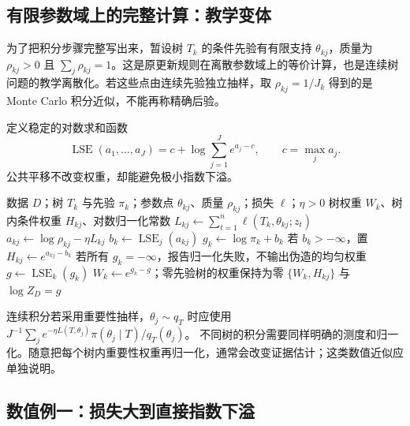 \subsection{有限参数域上的完整计算：教学变体}

为了把积分步骤完整写出来，暂设树 $T_k$ 的条件先验有有限支持
$\theta_{kj}$，质量为 $\rho_{kj}>0$ 且 $\sum_j\rho_{kj}=1$。这是原更新规则在离散参数域上的等价计算，也是连续树问题的教学离散化。若这些点由连续先验独立抽样，取 $\rho_{kj}=1/J_k$ 得到的是 Monte Carlo 积分近似，不能再称精确后验。

定义稳定的对数求和函数
\[
 \operatorname{LSE}(a_1,\ldots,a_J)
 =c+\log\sum_{j=1}^J e^{a_j-c},\qquad c=\max_j a_j.
\]
公共平移不改变权重，却能避免极小指数下溢。

\begin{algorithm}[htbp]
\caption{S14：有限候选树与有限条件先验的指数更新（教学离散化）}
\label{alg:textbook-S14}
\begin{algorithmic}[1]
\Require 数据 $D$；树 $T_k$ 与先验 $\pi_k$；参数点 $\theta_{kj}$、质量 $\rho_{kj}$；损失 $\ell$；$\eta>0$
\Ensure 树权重 $W_k$、树内条件权重 $H_{kj}$、对数归一化常数
    \State $L_{kj}\gets\sum_{t=1}^n\ell(T_k,\theta_{kj};z_t)$
    \State $a_{kj}\gets\log\rho_{kj}-\eta L_{kj}$
  \EndFor
  \State $b_k\gets\operatorname{LSE}_j(a_{kj})$
  \State $g_k\gets\log\pi_k+b_k$
  \State 若 $b_k>-\infty$，置 $H_{kj}\gets e^{a_{kj}-b_k}$
\EndFor
\State 若所有 $g_k=-\infty$，报告归一化失败，不输出伪造的均匀权重
\State $g\gets\operatorname{LSE}_k(g_k)$
\State $W_k\gets e^{g_k-g}$；零先验树的权重保持为零
\State \Return $\{W_k,H_{kj}\}$ 与 $\log Z_D=g$
\end{algorithmic}
\end{algorithm}

连续积分若采用重要性抽样，$\theta_j\sim q_T$ 时应使用
$J^{-1}\sum_j e^{-\eta L(T,\theta_j)}\pi(\theta_j\mid T)/q_T(\theta_j)$。
不同树的积分需要同样明确的测度和归一化。随意把每个树内重要性权重再归一化，通常会改变证据估计；这类数值近似应单独说明。

\subsection{数值例一：损失大到直接指数下溢}

